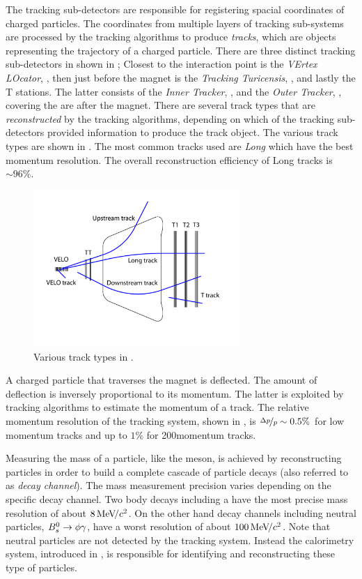 The tracking sub-detectors are responsible for registering spacial coordinates of charged particles.
The coordinates from multiple layers of tracking sub-systems are processed by the tracking algorithms
to produce {\it tracks}, which are objects representing the trajectory of a charged particle. There are
three distinct tracking sub-detectors in \lhcb shown in ; Closest to the interaction point is
the {\it VErtex LOcator}, \velo, then just before the \lhcb magnet is the {\it Tracking Turicensis}, \ttracker,
and  lastly the T stations. The latter consists of the {\it Inner Tracker}, \intr, and the {\it Outer Tracker}, \ot,
covering the are after the \lhcb magnet. There are several track types that are {\it reconstructed} by
the tracking algorithms, depending on which of the tracking sub-detectors provided information to produce
the track object. The various track types are shown in . The most common tracks used
are {\it Long} which have the best momentum resolution. The overall reconstruction efficiency of Long
tracks is $\sim 96\%$.

\begin{figure}[t]
  \centering
  \includegraphics[width=0.7\textwidth]{Figures/Chapter2/trackTypesRunIAndII}
  \caption{Various track types in \lhcb.}
  \label{track_types}
\end{figure}

A charged particle that traverses the \lhcb magnet is deflected. The amount of deflection is inversely proportional
to its momentum. The latter is exploited by tracking algorithms to estimate the momentum of a track. The relative
momentum resolution of the tracking system, shown in , is $\nicefrac{\Delta p}{p} \sim 0.5 \%$
for low momentum tracks and up to $1\%$ for 200\gevc momentum tracks.

Measuring the mass of a particle, like the \Bs meson, is achieved by reconstructing particles in order to build a
complete cascade of particle decays (also referred to as {\it decay channel}). The mass measurement precision varies depending
on the specific decay channel. Two body \B decays including a \jpsi have the most precise mass resolution of about
$8 {\mathrm{\,Me\kern -0.1em V\!/}c^2}$. On the other hand decay channels including neutral particles, \ie $B^0_s\rightarrow\phi\gamma$, have a worst
resolution of about $100 {\mathrm{\,Me\kern -0.1em V\!/}c^2}$. Note that neutral particles are not detected by the tracking system.
Instead the calorimetry system, introduced in , is responsible for identifying and
reconstructing these type of particles.

